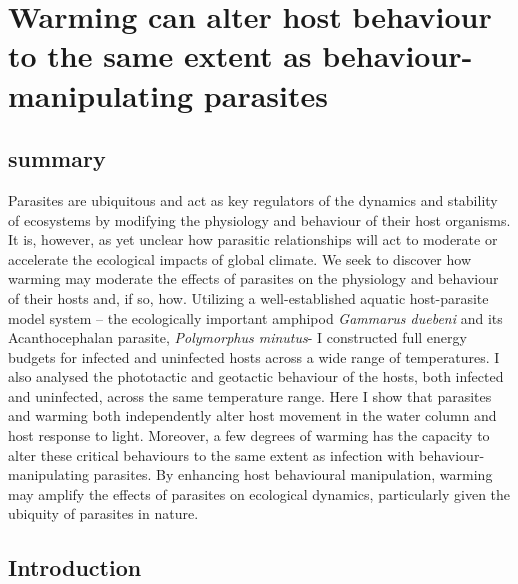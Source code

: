 \chapter[Warming can alter host behaviour to the same extent as behaviour-manipulating parasites]{Warming can alter host behaviour to the same extent as behaviour-manipulating parasites}
\label{chap:physbeh}

\section{summary}
Parasites are ubiquitous and act as key regulators of the dynamics and stability of ecosystems by modifying the physiology and behaviour of their host organisms. It is, however, as yet unclear how parasitic relationships will act to moderate or accelerate the ecological impacts of global climate. We seek to discover how warming may moderate the effects of parasites on the physiology and behaviour of their hosts and, if so, how. Utilizing a well-established aquatic host-parasite model system – the ecologically important amphipod \emph{Gammarus duebeni} and its Acanthocephalan parasite, \emph{Polymorphus minutus}- I constructed full energy budgets for infected and uninfected hosts across a wide range of temperatures. I also analysed the phototactic and geotactic behaviour of the hosts, both infected and uninfected, across the same temperature range. Here I show that parasites and warming both independently alter host movement in the water column and host response to light. Moreover, a few degrees of warming has the capacity to alter these critical behaviours to the same extent as infection with behaviour-manipulating parasites. By enhancing host behavioural manipulation, warming may amplify the effects of parasites on ecological dynamics, particularly given the ubiquity of parasites in nature. 


\section{Introduction}

